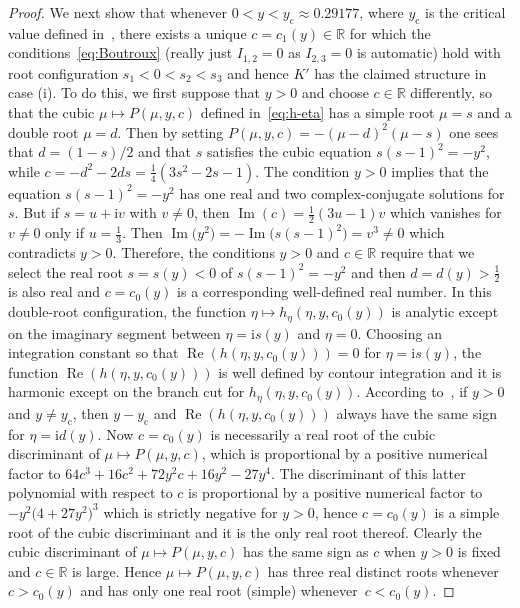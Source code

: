 \begin{proof}
We next show that whenever $0<y<y_\mathrm{c}\approx 0.29177$, where $y_\mathrm{c}$ is the critical value defined in~\cite[Section 4.6]{BuckinghamM22}, there exists a unique $c=c_1(y)\in\mathbb{R}$ for which the conditions~\eqref{eq:Boutroux} (really just $I_{1,2}=0$ as $I_{2,3}=0$ is automatic) hold with root configuration $s_1<0<s_2<s_3$ and hence $K'$ has the claimed structure in case (i). To do this, we first suppose that $y>0$ and choose $c\in\mathbb{R}$ differently, so that the cubic $\mu\mapsto P(\mu,y,c)$ defined in~\eqref{eq:h-eta} has a simple root $\mu=s$ and a double root $\mu=d$.
Then by setting $P(\mu,y,c)=-(\mu-d)^2(\mu-s)$ one sees that $d=(1-s)/2$ and that $s$ satisfies the cubic equation $s(s-1)^2=-y^2$, while $c=-d^2-2ds=\frac{1}{4}(3s^2-2s-1)$. The condition $y>0$ implies that the equation $s(s-1)^2=-y^2$ has one real and two complex-conjugate solutions for $s$. But if $s=u+\mathrm{i} v$ with $v\neq 0$, then $\operatorname{Im}(c)=\frac{1}{2}(3u-1)v$ which vanishes for $v\neq 0$ only if $u=\frac{1}{3}$. Then $\operatorname{Im}\bigl(y^2\bigr)=-\operatorname{Im}\bigl(s(s-1)^2\bigr)=v^3\neq 0$ which contradicts $y>0$. Therefore, the conditions $y>0$ and $c\in\mathbb{R}$ require that we select the real root $s=s(y)<0$ of $s(s-1)^2=-y^2$ and then $d=d(y)>\frac{1}{2}$ is also real and $c=c_0(y)$ is a corresponding well-defined real number. In this double-root configuration, the function $\eta\mapsto h_\eta(\eta,y,c_0(y))$ is analytic except on the imaginary segment between $\eta=\mathrm{i} s(y)$ and $\eta=0$. Choosing an integration constant so that $\operatorname{Re}(h(\eta,y,c_0(y)))=0$ for $\eta=\mathrm{i} s(y)$, the function $\operatorname{Re}(h(\eta,y,c_0(y)))$ is well defined by contour integration and it is harmonic except on the branch cut for $h_\eta(\eta,y,c_0(y))$. According to~\cite[Section 4.6]{BuckinghamM22}, if $y>0$ and $y\neq y_\mathrm{c}$, then $y-y_\mathrm{c}$ and $\operatorname{Re}(h(\eta,y,c_0(y)))$ always have the same sign for $\eta=\mathrm{i} d(y)$. Now $c=c_0(y)$ is necessarily a real root of the cubic discriminant of $\mu\mapsto P(\mu,y,c)$, which is proportional by a positive numerical factor to $64 c^3+16c^2+72y^2c + 16y^2-27y^4$. The discriminant of this latter polynomial with respect to $c$ is proportional by a positive numerical factor to $-y^2\bigl(4+27y^2\bigr)^3$ which is strictly negative for $y>0$, hence $c=c_0(y)$ is a simple root of the cubic discriminant and it is the only real root thereof. Clearly the cubic discriminant of $\mu\mapsto P(\mu,y,c)$ has the same sign as $c$ when $y>0$ is fixed and $c\in\mathbb{R}$ is large. Hence $\mu\mapsto P(\mu,y,c)$ has three real distinct roots whenever $c>c_0(y)$ and has only one real root (simple) whenever~${c<c_0(y)}$.


\end{proof}
